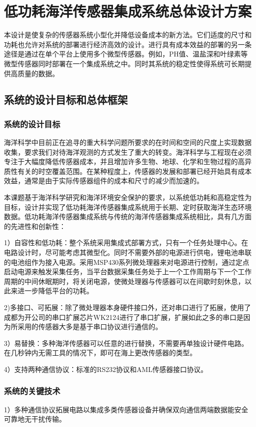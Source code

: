 \chapter{低功耗海洋传感器集成系统总体设计方案}
本设计是使复杂的传感器系统小型化并降低设备成本的新方法。它们适度的尺寸和功耗也允许对系统的部署进行经济高效的设计。进行具有成本效益的部署的另一条途径是通过在单个平台上使用多个微型传感器。例如，PH值、温盐深和叶绿素等微型传感器同时部署在一个集成系统之中。同时其系统的稳定性使得系统可长期提供高质量的数据。

\section{系统的设计目标和总体框架}
\subsection{系统的设计目标}
海洋科学中目前正在追寻的重大科学问题所要求的在时间和空间的尺度上实现数据收集，要求我们对待海洋观测的方式发生了重大的转变。海洋科学与工程现在必须专注于大幅度降低传感器成本，并且增加许多生物、地球、化学和生物过程的高异质性有关的时空覆盖范围。在某种程度上，传感器的发展和部署已经开始具有成本效益，通常是由于实际传感器组件的成本和尺寸的减少而加速的。

本课题基于海洋科学研究和海洋环境安全保护的要求，以系统低功耗和高稳定性为目标，设计并实现了低功耗海洋传感器集成系统用于长期、定时获取海洋生态环境数据。低功耗海洋传感器集成系统与传统的海洋传感器集成系统相比，具有几方面的先进性和创新性：

1）自容性和低功耗：整个系统采用集成式部署方式，只有一个任务处理中心。在电路设计时，尽可能考虑其微型化。同时不需要外部的电源进行供电，锂电池串联的电池组作为接入电源。采用MSP430系列微处理器来对电源进行控制，通过定点启动电源来触发采集任务，当平台数据采集任务处于上一个工作周期与下一个工作周期的中间休眠期时，将关闭电源，使微处理器与传感器可以在间歇时刻休息，以此来进一步降低平台的功耗。

2)多接口、可拓展：除了微处理器本身硬件接口外，还对串口进行了拓展，使用了成都为开公司的串口扩展芯片WK2124进行了串口扩展，扩展如此之多的串口是因为所采用的传感器大多是基于串口协议进行通信的。

3）易替换：多种海洋传感器可以任意的进行替换，不需要再单独设计硬件电路。在几秒钟内无需工具的情况下，即可在海上更改传感器的类型。

4）支持两种通信协议：标准的RS232协议和AML传感器接口协议。

\subsection{系统的关键技术}
1）多种通信协议拓展电路以集成多类传感器设备并确保双向通信两端数据能安全可靠地无干扰传输。

